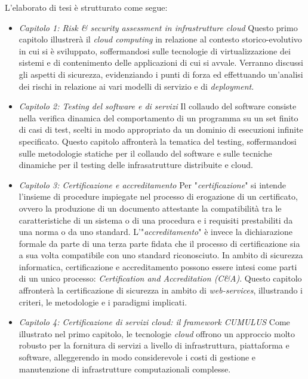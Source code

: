 \documentclass[../main.tex]{subfiles}
\begin{document}
L'elaborato di tesi è strutturato come segue:
\begin{itemize}
\item \textit{Capitolo 1: \textit{Risk \& security assessment} in infrastrutture cloud}\newline
Questo primo capitolo illustrerà il \textit{cloud computing} in relazione al contesto storico-evolutivo in cui si è sviluppato, soffermandosi sulle tecnologie di virtualizzazione dei sistemi e di contenimento delle applicazioni di cui si avvale.
Verranno discussi gli aspetti di sicurezza, evidenziando i punti di forza ed effettuando un'analisi dei rischi in relazione ai vari modelli di servizio e di \textit{deployment}.
\item \textit{Capitolo 2: Testing del software e di servizi}\newline
Il collaudo del software consiste nella verifica dinamica del comportamento di un programma su un set finito di casi di test, scelti in modo appropriato da un dominio di esecuzioni infinite specificato.
Questo capitolo affronterà la tematica del testing, soffermandosi sulle metodologie statiche per il collaudo del software e sulle tecniche dinamiche per il testing delle infrasatrutture distribuite e cloud.
\item \textit{Capitolo 3: Certificazione e accreditamento}\newline
Per "\textit{certificazione}" si intende l'insieme di procedure impiegate nel processo di erogazione di un certificato, ovvero la produzione di un documento attestante la compatibilità tra le caratteristiche di un sistema o di una procedura e i requisiti prestabiliti da una norma o da uno standard.
L'"\textit{accreditamento}" è invece la dichiarazione formale da parte di una terza parte fidata che il processo di certificazione sia a sua volta compatibile con uno standard riconosciuto.
In ambito di sicurezza informatica, certificazione e accreditamento possono essere intesi come parti di un unico processo: \textit{Certification and Accreditation (C\&A)}.
Questo capitolo affronterà la certificazione di sicurezza in ambito di \textit{web-services}, illustrando i criteri, le metodologie e i paradigmi implicati.
\item \textit{Capitolo 4: Certificazione di servizi cloud: il framework CUMULUS}\newline
Come illustrato nel primo capitolo, le tecnologie \textit{cloud} offrono un approccio molto robusto per la fornitura di servizi a livello di infrastruttura, piattaforma e software, alleggerendo in modo considerevole i costi di gestione e manutenzione di infrastrutture computazionali complesse.

\end{itemize}
\end{document}
